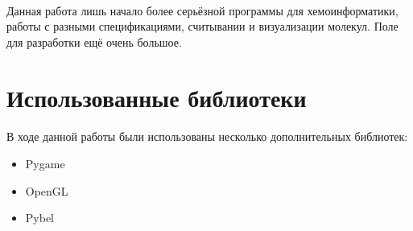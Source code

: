 \documentclass[a4paper,12pt]{article}
\begin{document}
\paragraph{} Данная работа лишь начало более серьёзной программы для хемоинформатики, работы с разными спецификациями, считывании и визуализации молекул. Поле для разработки ещё очень большое.

\section{Использованные библиотеки}
\paragraph{} В ходе данной работы были использованы несколько дополнительных библиотек:
\begin{itemize}
\item Pygame
\item OpenGL
\item Pybel
\end{itemize}
\end{document}
